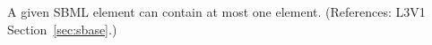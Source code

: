 A given SBML element can contain at most one  element.
(References: L3V1 Section~\ref{sec:sbase}.)

